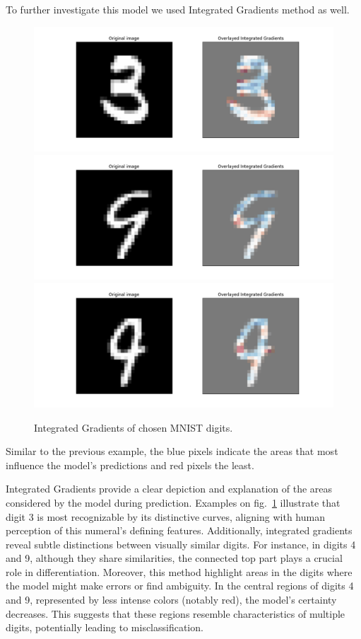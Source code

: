 \documentclass[journal, a4paper]{IEEEtran}
\begin{document}
To further investigate this model we used Integrated Gradients method as well.
\begin{figure}[h]\centering
    \includegraphics[width=.6\linewidth]{img/integrated_grad/mnist_CNN/3}
    \includegraphics[width=.6\linewidth]{img/integrated_grad/mnist_CNN/4_again2}
    \includegraphics[width=.6\linewidth]{img/integrated_grad/mnist_CNN/9}
    \caption{Integrated Gradients of chosen MNIST digits.}\label{fig:mnist-cnn-integrated-grad}
\end{figure}
Similar to the previous example, the blue pixels indicate the areas that most influence the model's predictions and red pixels the least.

Integrated Gradients provide a clear depiction and explanation of the areas considered by the model during prediction.
Examples on fig.~\ref{fig:mnist-cnn-integrated-grad} illustrate that digit 3 is most recognizable by its distinctive curves, aligning with human perception of this numeral's defining features.
Additionally, integrated gradients reveal subtle distinctions between visually similar digits.
For instance, in digits 4 and 9, although they share similarities, the connected top part plays a crucial role in differentiation.
Moreover, this method highlight areas in the digits where the model might make errors or find ambiguity.
In the central regions of digits 4 and 9, represented by less intense colors (notably red), the model's certainty decreases.
This suggests that these regions resemble characteristics of multiple digits, potentially leading to misclassification.
\end{document}
